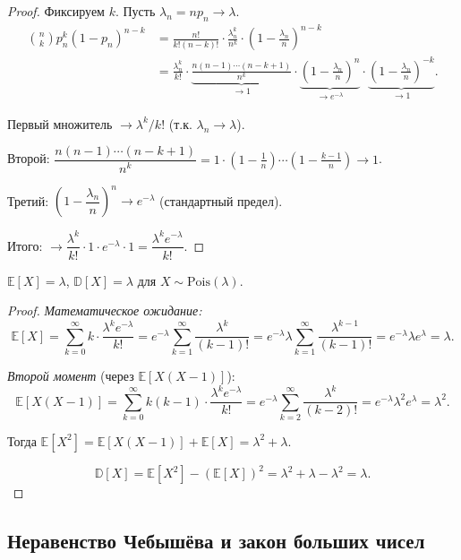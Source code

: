 \documentclass[12pt]{article}
\begin{document}
	\begin{proof}
		Фиксируем $k$. Пусть $\lambda_n = np_n \to \lambda$.
		\begin{align*}
			\binom{n}{k} p_n^k (1-p_n)^{n-k} &= \frac{n!}{k!(n-k)!} \cdot \frac{\lambda_n^k}{n^k} \cdot \left(1 - \frac{\lambda_n}{n}\right)^{n-k} \\
			&= \frac{\lambda_n^k}{k!} \cdot \underbrace{\frac{n(n-1)\cdots(n-k+1)}{n^k}}_{\to 1} \cdot \underbrace{\left(1 - \frac{\lambda_n}{n}\right)^n}_{\to e^{-\lambda}} \cdot \underbrace{\left(1 - \frac{\lambda_n}{n}\right)^{-k}}_{\to 1}.
		\end{align*}
		
		Первый множитель $\to \lambda^k / k!$ (т.к. $\lambda_n \to \lambda$).
		
		Второй: $\dfrac{n(n-1)\cdots(n-k+1)}{n^k} = 1 \cdot \left(1 - \frac{1}{n}\right) \cdots \left(1 - \frac{k-1}{n}\right) \to 1$.
		
		Третий: $\left(1 - \dfrac{\lambda_n}{n}\right)^n \to e^{-\lambda}$ (стандартный предел).
		
		Итого: $\to \dfrac{\lambda^k}{k!} \cdot 1 \cdot e^{-\lambda} \cdot 1 = \dfrac{\lambda^k e^{-\lambda}}{k!}$.
	\end{proof}
	
	\begin{theorem}
		$\mathbb{E}[X] = \lambda$, $\mathbb{D}[X] = \lambda$ для $X \sim \text{Pois}(\lambda)$.
	\end{theorem}
	
	\begin{proof}
		\textit{Математическое ожидание:}
		\[\mathbb{E}[X] = \sum_{k=0}^{\infty} k \cdot \frac{\lambda^k e^{-\lambda}}{k!} = e^{-\lambda} \sum_{k=1}^{\infty} \frac{\lambda^k}{(k-1)!} = e^{-\lambda} \lambda \sum_{k=1}^{\infty} \frac{\lambda^{k-1}}{(k-1)!} = e^{-\lambda} \lambda e^{\lambda} = \lambda.\]
		
		\textit{Второй момент} (через $\mathbb{E}[X(X-1)]$):
		\[\mathbb{E}[X(X-1)] = \sum_{k=0}^{\infty} k(k-1) \cdot \frac{\lambda^k e^{-\lambda}}{k!} = e^{-\lambda} \sum_{k=2}^{\infty} \frac{\lambda^k}{(k-2)!} = e^{-\lambda} \lambda^2 e^{\lambda} = \lambda^2.\]
		
		Тогда $\mathbb{E}[X^2] = \mathbb{E}[X(X-1)] + \mathbb{E}[X] = \lambda^2 + \lambda$.
		
		\[\mathbb{D}[X] = \mathbb{E}[X^2] - (\mathbb{E}[X])^2 = \lambda^2 + \lambda - \lambda^2 = \lambda.\]
	\end{proof}
	
	\subsection{Неравенство Чебышёва и закон больших чисел}
	
\end{document}
